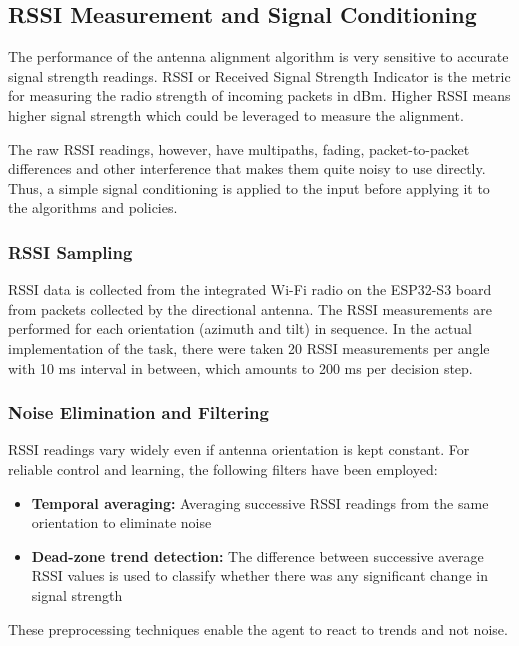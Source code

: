 \subsection{RSSI Measurement and Signal Conditioning}

The performance of the antenna alignment algorithm is very sensitive to
accurate signal strength readings. RSSI or Received Signal Strength Indicator is
the metric for measuring the radio strength of incoming packets in dBm. Higher RSSI
means higher signal strength which could be leveraged to measure the alignment.

The raw RSSI readings, however, have multipaths, fading, packet-to-packet
differences and other interference that makes them quite noisy to use directly. Thus,
a simple signal conditioning is applied to the input before applying it to the
algorithms and policies.

\subsubsection{RSSI Sampling}

RSSI data is collected from the integrated Wi-Fi radio on the ESP32-S3 board from
packets collected by the directional antenna. The RSSI measurements are performed
for each orientation (azimuth and tilt) in sequence. In the actual implementation
of the task, there were taken 20 RSSI measurements per angle with 10 ms interval in
between, which amounts to 200 ms per decision step.

\subsubsection{Noise Elimination and Filtering}

RSSI readings vary widely even if antenna orientation is kept constant. For reliable
control and learning, the following filters have been employed:
\begin{itemize}
    \item \textbf{Temporal averaging:} Averaging successive RSSI readings from the
    same orientation to eliminate noise
    \item \textbf{Dead-zone trend detection:} The difference between successive
    average RSSI values is used to classify whether there was any significant change
    in signal strength
\end{itemize}

These preprocessing techniques enable the agent to react to trends and not noise.

